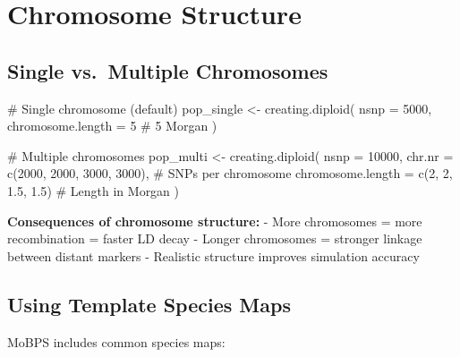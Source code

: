 \documentclass[
  letterpaper,
]{book}
\newenvironment{Shaded}{\begin{snugshade}}{\end{snugshade}}
\newcommand{\AttributeTok}[1]{\textcolor[rgb]{0.40,0.45,0.13}{#1}}
\newcommand{\CommentTok}[1]{\textcolor[rgb]{0.37,0.37,0.37}{#1}}
\newcommand{\DecValTok}[1]{\textcolor[rgb]{0.68,0.00,0.00}{#1}}
\newcommand{\FloatTok}[1]{\textcolor[rgb]{0.68,0.00,0.00}{#1}}
\newcommand{\FunctionTok}[1]{\textcolor[rgb]{0.28,0.35,0.67}{#1}}
\newcommand{\NormalTok}[1]{\textcolor[rgb]{0.00,0.23,0.31}{#1}}
\newcommand{\OtherTok}[1]{\textcolor[rgb]{0.00,0.23,0.31}{#1}}
\begin{document}
\section{Chromosome Structure}\label{sec-chromosomes}

\subsection{Single vs.~Multiple
Chromosomes}\label{single-vs.-multiple-chromosomes}

\begin{Shaded}
\begin{Highlighting}[]
\CommentTok{\# Single chromosome (default)}
\NormalTok{pop\_single }\OtherTok{\textless{}{-}} \FunctionTok{creating.diploid}\NormalTok{(}
  \AttributeTok{nsnp =} \DecValTok{5000}\NormalTok{,}
  \AttributeTok{chromosome.length =} \DecValTok{5}  \CommentTok{\# 5 Morgan}
\NormalTok{)}

\CommentTok{\# Multiple chromosomes}
\NormalTok{pop\_multi }\OtherTok{\textless{}{-}} \FunctionTok{creating.diploid}\NormalTok{(}
  \AttributeTok{nsnp =} \DecValTok{10000}\NormalTok{,}
  \AttributeTok{chr.nr =} \FunctionTok{c}\NormalTok{(}\DecValTok{2000}\NormalTok{, }\DecValTok{2000}\NormalTok{, }\DecValTok{3000}\NormalTok{, }\DecValTok{3000}\NormalTok{),  }\CommentTok{\# SNPs per chromosome}
  \AttributeTok{chromosome.length =} \FunctionTok{c}\NormalTok{(}\DecValTok{2}\NormalTok{, }\DecValTok{2}\NormalTok{, }\FloatTok{1.5}\NormalTok{, }\FloatTok{1.5}\NormalTok{) }\CommentTok{\# Length in Morgan}
\NormalTok{)}
\end{Highlighting}
\end{Shaded}

\textbf{Consequences of chromosome structure:} - More chromosomes = more
recombination = faster LD decay - Longer chromosomes = stronger linkage
between distant markers - Realistic structure improves simulation
accuracy

\subsection{Using Template Species
Maps}\label{using-template-species-maps}

MoBPS includes common species maps:
\end{document}
